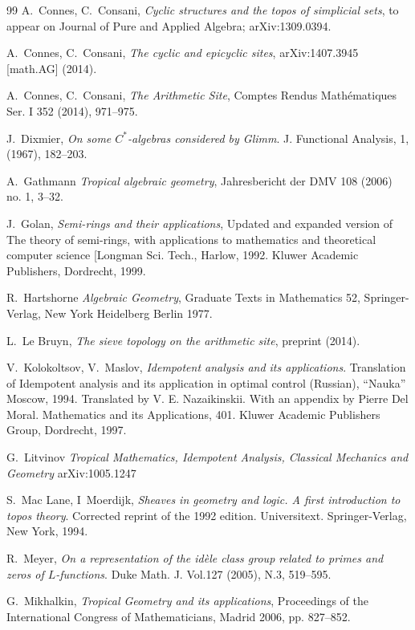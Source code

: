 \documentclass[noams,lp]{compositio}
\begin{document}
\begin{thebibliography}{99}
 A.~Connes, C.~Consani, {\em Cyclic structures and the topos of simplicial sets}, to appear on Journal of Pure and Applied Algebra; arXiv:1309.0394.

 A.~Connes, C.~Consani, {\em The cyclic and epicyclic sites}, arXiv:1407.3945 [math.AG] (2014).

 A.~Connes, C.~Consani, {\em The Arithmetic Site}, Comptes Rendus Math\' ematiques Ser. I 352 (2014), 971--975. 


 J.~Dixmier,  {\em On some $C^*$-algebras considered by Glimm}. J. Functional Analysis, 1, (1967), 182--203.


 A.~Gathmann {\em Tropical algebraic geometry}, Jahresbericht der DMV 108 (2006) no. 1, 3--32.


 J.~Golan, {\em Semi-rings and their applications}, Updated and expanded version of The theory of semi-rings, with applications to mathematics and theoretical computer science [Longman Sci. Tech., Harlow, 1992. Kluwer Academic Publishers, Dordrecht, 1999.

 R.~Hartshorne  {\em Algebraic Geometry}, Graduate Texts in Mathematics 52, Springer-Verlag, New York Heidelberg Berlin 1977.

 L.~Le Bruyn, {\em The sieve topology on the arithmetic site}, preprint (2014).


 V.~Kolokoltsov, V.~Maslov, {\em Idempotent analysis and its applications}. Translation of Idempotent analysis and its application in optimal control (Russian), ``Nauka'' Moscow, 1994. Translated by V. E. Nazaikinskii. With an appendix by Pierre Del Moral. Mathematics and its Applications, 401. Kluwer Academic Publishers Group, Dordrecht, 1997.


 G.~Litvinov {\em Tropical Mathematics, Idempotent Analysis, Classical Mechanics and Geometry} arXiv:1005.1247


 S.~Mac Lane, I~Moerdijk, {\em Sheaves in geometry and logic. A first introduction to topos theory}. Corrected reprint of the 1992 edition. Universitext. Springer-Verlag, New York, 1994.

 R.~Meyer, {\em On a representation of the id\`ele class group related to primes and zeros of $L$-functions}.  Duke Math. J. Vol.127 (2005), N.3, 519--595.

 G.~Mikhalkin, {\em Tropical Geometry and its applications}, Proceedings of the International Congress of Mathematicians, Madrid 2006, pp. 827--852.


\end{thebibliography}
\end{document}
